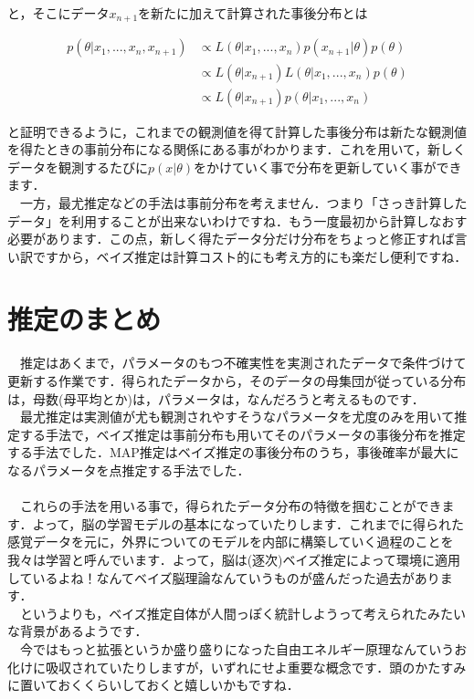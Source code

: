 \documentclass[11pt,a4paper,uplatex]{ujreport} 	%
\begin{document}
と，そこにデータ$x_{n+1}$を新たに加えて計算された事後分布とは

\begin{align}
p(\theta|x_1, ..., x_{n}, x_{n+1}) &\propto L(\theta|x_1, ..., x_{n})p(x_{n+1}|\theta)p(\theta)\\ 
& \propto L(\theta|x_{n+1})L(\theta|x_1,...,x_{n}) p(\theta)\\
& \propto L(\theta|x_{n+1})p(\theta|x_1,...,x_{n})
\end{align}

と証明できるように，これまでの観測値を得て計算した事後分布は新たな観測値を得たときの事前分布になる関係にある事がわかります．これを用いて，新しくデータを観測するたびに$p(x|\theta)$をかけていく事で分布を更新していく事ができます．\\
　一方，最尤推定などの手法は事前分布を考えません．つまり「さっき計算したデータ」を利用することが出来ないわけですね．もう一度最初から計算しなおす必要があります．この点，新しく得たデータ分だけ分布をちょっと修正すれば言い訳ですから，ベイズ推定は計算コスト的にも考え方的にも楽だし便利ですね．




\section{推定のまとめ}
　推定はあくまで，パラメータのもつ不確実性を実測されたデータで条件づけて更新する作業です．得られたデータから，そのデータの母集団が従っている分布は，母数(母平均とか)は，パラメータは，なんだろうと考えるものです．\\
　最尤推定は実測値が尤も観測されやすそうなパラメータを尤度のみを用いて推定する手法で，ベイズ推定は事前分布も用いてそのパラメータの事後分布を推定する手法でした．MAP推定はベイズ推定の事後分布のうち，事後確率が最大になるパラメータを点推定する手法でした．\\
\\
　これらの手法を用いる事で，得られたデータ分布の特徴を掴むことができます．よって，脳の学習モデルの基本になっていたりします．これまでに得られた感覚データを元に，外界についてのモデルを内部に構築していく過程のことを我々は学習と呼んでいます．よって，脳は(逐次)ベイズ推定によって環境に適用しているよね！なんてベイズ脳理論なんていうものが盛んだった過去があります．\\
　というよりも，ベイズ推定自体が人間っぽく統計しようって考えられたみたいな背景があるようです．\\
　今ではもっと拡張というか盛り盛りになった自由エネルギー原理なんていうお化けに吸収されていたりしますが，いずれにせよ重要な概念です．頭のかたすみに置いておくくらいしておくと嬉しいかもですね．\\
\end{document}
